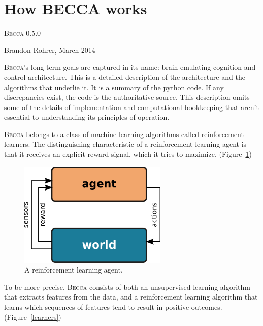 \documentclass[oneside,twocolumn]{article}
\begin{document}
\addtolength{\parskip}{\baselineskip}

\section*{\color{copper} \huge How BECCA works}

\textsc{Becca} 0.5.0 

Brandon Rohrer, March 2014

\textsc{Becca}'s long term goals are captured in its name: brain-emulating cognition and control architecture. This is a detailed description of the architecture and the algorithms that underlie it. It is a summary of the python code. If any discrepancies exist, the code is the authoritative source. This description omits some of the details of implementation and computational bookkeeping that aren't essential to understanding its principles of operation.  

\textsc{Becca} belongs to a class of machine learning algorithms called reinforcement learners. The distinguishing characteristic of a reinforcement learning agent is that it receives an explicit reward signal, which it tries to maximize. (Figure~\ref{rl}) 

\begin{figure}[ht]
\centering
\includegraphics[height=5.0cm]{figs/rl.png}
\caption{A reinforcement learning agent.}
\label{rl}
\end{figure}

To be more precise, \textsc{Becca} consists of both an unsupervised learning algorithm that extracts features from the data, and a reinforcement learning algorithm that learns which sequences of features tend to result in positive outcomes. (Figure~\ref{learners})
\end{document}
